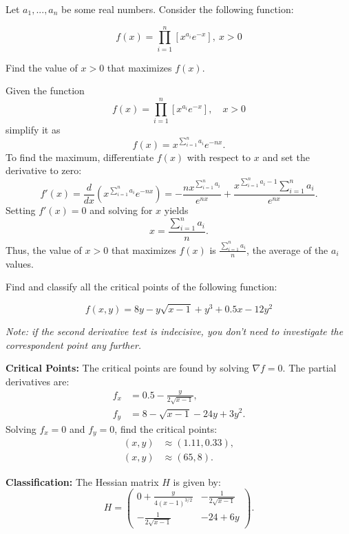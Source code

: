 \documentclass{exam}
\begin{document}
\begin{questions}
\question[8]
Let $a_1,..., a_n$ be some real numbers. Consider the following function:

$$f(x) = \prod_{i=1}^{n}{[x^{a_i}e^{-x}]}, \ x>0$$

\vspace{0.25cm}
\noindent
Find the value of $x>0$ that maximizes $f(x)$.

\begin{solution}
Given the function
\[
f(x) = \prod_{i=1}^{n}{[x^{a_i}e^{-x}]}, \quad x>0
\]
simplify it as
\[
f(x) = x^{\sum_{i=1}^{n} a_i} e^{-nx}.
\]
To find the maximum, differentiate \( f(x) \) with respect to \( x \) and set the derivative to zero:
\[
f'(x) = \frac{d}{dx}\left( x^{\sum_{i=1}^{n} a_i} e^{-nx} \right) = -\frac{n x^{\sum_{i=1}^{n} a_i}}{e^{nx}} + \frac{x^{\sum_{i=1}^{n} a_i - 1} \sum_{i=1}^{n} a_i}{e^{nx}}.
\]
Setting \( f'(x) = 0 \) and solving for \( x \) yields
\[
x = \frac{\sum_{i=1}^{n} a_i}{n}.
\]
Thus, the value of \( x > 0 \) that maximizes \( f(x) \) is \( \frac{\sum_{i=1}^{n} a_i}{n} \), the average of the \( a_i \) values.
\end{solution}

\question[4]
Find and classify all the critical points of the following function:

$$f(x, y) = 8y - y\sqrt{x-1} +y^3 +0.5x - 12y^2$$

\vspace{0.25cm}
\noindent
\textit{Note: if the second derivative test is indecisive, you don’t need to investigate the correspondent point any further.}

\begin{solution}


\textbf{Critical Points:}
The critical points are found by solving \(\nabla f = 0\). The partial derivatives are:
\begin{align*}
    f_x &= 0.5 - \frac{y}{2\sqrt{x - 1}}, \\
    f_y &= 8 - \sqrt{x - 1} - 24y + 3y^2.
\end{align*}
Solving \( f_x = 0 \) and \( f_y = 0 \), find the critical points:
\begin{align*}
    (x, y) &\approx (1.11, 0.33), \\
    (x, y) &\approx (65, 8).
\end{align*}

\textbf{Classification:}
The Hessian matrix \( H \) is given by:
\[
H = \begin{pmatrix}
    0 + \frac{y}{4(x - 1)^{3/2}} & -\frac{1}{2\sqrt{x - 1}} \\
    -\frac{1}{2\sqrt{x - 1}} & -24 + 6y
\end{pmatrix}.
\]


\end{solution}
\end{questions}
\end{document}
